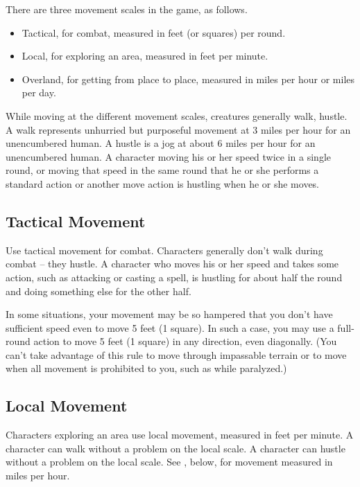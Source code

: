 There are three movement scales in the game, as follows.
\begin{itemize}
\item Tactical, for combat, measured in feet (or squares) per round.
\item Local, for exploring an area, measured in feet per minute.
\item Overland, for getting from place to place, measured in miles per
hour or miles per day.
\end{itemize}

 While moving at the different movement scales, creatures generally walk, hustle.
 A walk represents unhurried but purposeful movement at 3 miles per hour for an unencumbered human.
 A hustle is a jog at about 6 miles per hour for an unencumbered human. A character moving his or her
speed twice in a single round, or moving that speed in the same round that he or she performs a standard action or another move action is hustling when he or she moves.

\subsection{Tactical Movement}
Use tactical movement for combat. Characters generally don't walk during combat -- they hustle. A character who
moves his or her speed and takes some action, such as attacking or casting a spell, is hustling for about half the round and doing something else for the other half.

 In some situations, your movement may be so hampered that you don't have sufficient speed even to move 5 feet (1 square). In such a case, you may use a full-round action to move 5 feet (1 square) in any direction, even diagonally. (You can't take advantage of this rule to move through impassable terrain or to move when all movement is prohibited to you, such as while paralyzed.)

\subsection{Local Movement}
Characters exploring an area use local movement, measured in feet per minute.
 A character can walk without a problem on the local scale.
 A character can hustle without a problem on the local scale. See , below, for movement measured in miles per hour.

